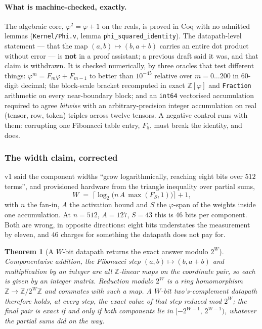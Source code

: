 \documentclass[11pt]{article}
\newtheorem{theorem}{Theorem}
\theoremstyle{definition}
\begin{document}
\paragraph{What is machine-checked, exactly.} The algebraic core,
$\varphi^{2} = \varphi + 1$ on the reals, is proved in Coq with no admitted
lemmas (\texttt{Kernel/Phi.v}, lemma \texttt{phi\_squared\_identity}). The
datapath-level statement --- that the map $(a,b)\mapsto(b,a+b)$ carries an entire
dot product without error --- is \textbf{not} in a proof assistant; a previous
draft said it was, and that claim is withdrawn. It is checked numerically, by
three oracles that test different things:
$\varphi^{m} = F_m\varphi + F_{m-1}$ to better than $10^{-45}$ relative over
$m = 0\dots200$ in $60$-digit decimal; the block-scale bracket recomputed in
exact $\mathbb{Z}[\varphi]$ and \texttt{Fraction} arithmetic on every
near-boundary block; and an \texttt{int64} vectorised accumulation required to
agree \emph{bitwise} with an arbitrary-precision integer accumulation on real
(tensor, row, token) triples across twelve tensors. A negative control runs with
them: corrupting one Fibonacci table entry, $F_5$, must break the identity, and
does.

\subsubsection*{The width claim, corrected}

v1 said the component widths ``grow logarithmically, reaching eight bits over
$512$ terms'', and provisioned hardware from the triangle inequality over partial
sums,
\begin{equation}
  W \;=\; \bigl\lceil \log_{2}\!\bigl(n\,A\,\max(F_S,1)\bigr) \bigr\rceil + 1 ,
  \label{eq:wcbound}
\end{equation}
with $n$ the fan-in, $A$ the activation bound and $S$ the $\varphi$-span of the
weights inside one accumulation. At $n=512$, $A=127$, $S=43$ this is $46$ bits
per component. Both are wrong, in opposite directions: eight bits understates the
measurement by eleven, and $46$ charges for something the datapath does not pay
for.

\begin{theorem}[A $W$-bit datapath returns the exact answer modulo $2^{W}$]
\label{thm:modw}
Componentwise addition, the Fibonacci step $(a,b)\mapsto(b,a+b)$ and
multiplication by an integer are all $\mathbb{Z}$-linear maps on the coordinate
pair, so each is given by an integer matrix. Reduction modulo $2^{W}$ is a ring
homomorphism $\mathbb{Z} \to \mathbb{Z}/2^{W}\mathbb{Z}$ and commutes with such a
map. A $W$-bit two's-complement datapath therefore holds, at every step, the
exact value of that step reduced mod $2^{W}$; the final pair is exact if and only
if both components lie in $[-2^{W-1},\,2^{W-1})$, whatever the partial sums did
on the way.
\end{theorem}
\end{document}
